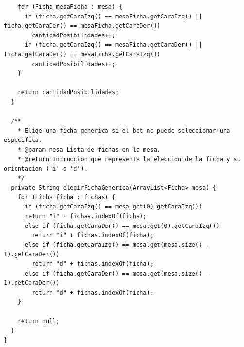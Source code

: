 \documentclass[12pt]{article}
\begin{document}
\begin{lstlisting}
    for (Ficha mesaFicha : mesa) {
      if (ficha.getCaraIzq() == mesaFicha.getCaraIzq() || ficha.getCaraDer() == mesaFicha.getCaraDer()) 
        cantidadPosibilidades++;
      if (ficha.getCaraIzq() == mesaFicha.getCaraDer() || ficha.getCaraDer() == mesaFicha.getCaraIzq()) 
        cantidadPosibilidades++;
    }

    return cantidadPosibilidades;
  }

  /**
    * Elige una ficha generica si el bot no puede seleccionar una especifica.
    * @param mesa Lista de fichas en la mesa.
    * @return Intruccion que representa la eleccion de la ficha y su orientacion ('i' o 'd').
    */
  private String elegirFichaGenerica(ArrayList<Ficha> mesa) {
    for (Ficha ficha : fichas) {
      if (ficha.getCaraIzq() == mesa.get(0).getCaraIzq()) 
      return "i" + fichas.indexOf(ficha);
      else if (ficha.getCaraDer() == mesa.get(0).getCaraIzq()) 
        return "i" + fichas.indexOf(ficha);
      else if (ficha.getCaraIzq() == mesa.get(mesa.size() - 1).getCaraDer()) 
        return "d" + fichas.indexOf(ficha);
      else if (ficha.getCaraDer() == mesa.get(mesa.size() - 1).getCaraDer()) 
        return "d" + fichas.indexOf(ficha);
    }

    return null;
  }
}
  \end{lstlisting}
\end{document}
